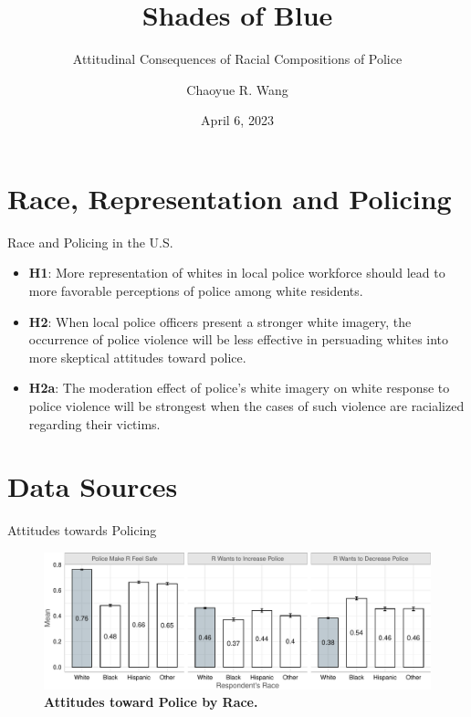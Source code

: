 \documentclass[
  10pt,
  ignorenonframetext,
]{beamer}
\title{Shades of Blue}
\subtitle{Attitudinal Consequences of Racial Compositions of Police}
\author{Chaoyue R. Wang}
\date{April 6, 2023}
\institute{Independent Researcher}
\begin{document}
\frame{\titlepage}
\ifdefined\Shaded\renewenvironment{Shaded}{\begin{tcolorbox}[sharp corners, enhanced, frame hidden, interior hidden, breakable, boxrule=0pt, borderline west={3pt}{0pt}{shadecolor}]}{\end{tcolorbox}}\fi

\hypertarget{race-representation-and-policing}{%
\section{Race, Representation and
Policing}\label{race-representation-and-policing}}

\begin{frame}{Race and Policing in the U.S.}
\protect\hypertarget{race-and-policing-in-the-u.s.}{}
\begin{itemize}
\item
  \textbf{H1}: More representation of whites in local police workforce
  should lead to more favorable perceptions of police among white
  residents.
\item
  \textbf{H2}: When local police officers present a stronger white
  imagery, the occurrence of police violence will be less effective in
  persuading whites into more skeptical attitudes toward police.
\item
  \textbf{H2a}: The moderation effect of police's white imagery on white
  response to police violence will be strongest when the cases of such
  violence are racialized regarding their victims.
\end{itemize}
\end{frame}

\hypertarget{data-sources}{%
\section{Data Sources}\label{data-sources}}

\begin{frame}{Attitudes towards Policing}
\protect\hypertarget{attitudes-towards-policing}{}
\begin{figure}[tb]

{\centering \includegraphics{slides_files/figure-beamer/fig-attitudes-1.pdf}

}

\caption{\label{fig-attitudes}\textbf{Attitudes toward Police by Race.}}

\end{figure}
\end{frame}
\end{document}
